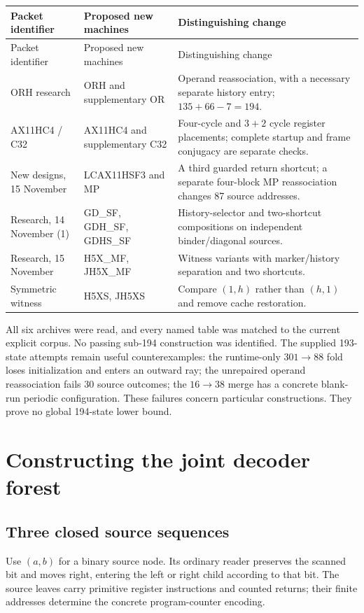 \documentclass[11pt]{article}
\begin{document}
\begin{longtable}{@{}p{}p{}p{}@{}}
\toprule
Packet identifier & Proposed new machines & Distinguishing change\\\midrule
\endfirsthead
\toprule Packet identifier & Proposed new machines & Distinguishing change\\\midrule
\endhead
ORH research & ORH and supplementary OR & Operand reassociation, with a necessary separate history entry; $135+66-7=194$.\\
AX11HC4 / C32 & AX11HC4 and supplementary C32 & Four-cycle and $3+2$ cycle register placements; complete startup and frame conjugacy are separate checks.\\
New designs, 15 November & LCAX11HSF3 and MP & A third guarded return shortcut; a separate four-block MP reassociation changes 87 source addresses.\\
Research, 14 November (1) & GD\_SF, GDH\_SF, GDHS\_SF & History-selector and two-shortcut compositions on independent binder/diagonal sources.\\
Research, 15 November & H5X\_MF, JH5X\_MF & Witness variants with marker/history separation and two shortcuts.\\
Symmetric witness & H5XS, JH5XS & Compare $(1,h)$ rather than $(h,1)$ and remove cache restoration.\\
\bottomrule
\end{longtable}

All six archives were read, and every named table was matched to the
current explicit corpus. No passing sub-194 construction was identified.
The supplied 193-state attempts remain useful counterexamples: the
runtime-only $301\to88$ fold loses initialization and enters an outward
ray; the unrepaired operand reassociation fails 30 source outcomes;
the $16\to38$ merge has a concrete blank-run periodic configuration.
These failures concern particular constructions. They prove no global
194-state lower bound.

\section{Constructing the joint decoder forest}
\label{sec:forest}

\subsection{Three closed source sequences}

Use $(a,b)$ for a binary source node. Its ordinary reader preserves
the scanned bit and moves right, entering the left or right child
according to that bit. The source leaves carry primitive register
instructions and counted returns; their finite addresses determine
the concrete program-counter encoding.
\end{document}
